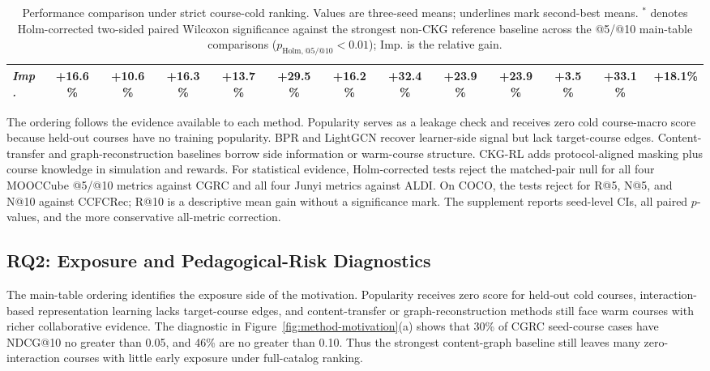 \documentclass[letterpaper]{article}
\begin{document}
\begin{table}[t]
{\begin{tabular}{lcccccccccccc}
\emph{Imp.} & +16.6\% & +10.6\% & +16.3\% & +13.7\% & +29.5\% & +16.2\% & +32.4\% & +23.9\% & +23.9\% & +3.5\% & +33.1\% & +18.1\% \\
\bottomrule
\end{tabular}
}
\caption{Performance comparison under strict course-cold ranking. Values are three-seed means; underlines mark second-best means. \(^{*}\) denotes Holm-corrected two-sided paired Wilcoxon significance against the strongest non-CKG reference baseline across the @5/@10 main-table comparisons (\(p_{\mathrm{Holm,@5/@10}}<0.01\)); Imp. is the relative gain.}
\label{tab:main-cold-results}
\end{table}

The ordering follows the evidence available to each method. Popularity serves as a leakage check and receives zero cold course-macro score because held-out courses have no training popularity. BPR and LightGCN recover learner-side signal but lack target-course edges. Content-transfer and graph-reconstruction baselines borrow side information or warm-course structure. CKG-RL adds protocol-aligned masking plus course knowledge in simulation and rewards. For statistical evidence, Holm-corrected tests reject the matched-pair null for all four MOOCCube @5/@10 metrics against CGRC and all four Junyi metrics against ALDI. On COCO, the tests reject for R@5, N@5, and N@10 against CCFCRec; R@10 is a descriptive mean gain without a significance mark. The supplement reports seed-level CIs, all paired \(p\)-values, and the more conservative all-metric correction.

\subsection{RQ2: Exposure and Pedagogical-Risk Diagnostics}
The main-table ordering identifies the exposure side of the motivation. Popularity receives zero score for held-out cold courses, interaction-based representation learning lacks target-course edges, and content-transfer or graph-reconstruction methods still face warm courses with richer collaborative evidence. The diagnostic in Figure~\ref{fig:method-motivation}(a) shows that 30\% of CGRC seed-course cases have NDCG@10 no greater than 0.05, and 46\% are no greater than 0.10. Thus the strongest content-graph baseline still leaves many zero-interaction courses with little early exposure under full-catalog ranking.
\end{document}
